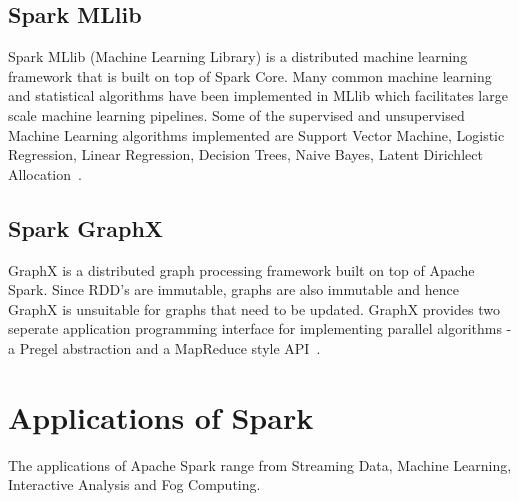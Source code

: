 \subsection{Spark MLlib}
Spark MLlib (Machine Learning Library) is a distributed machine learning 
framework that is built on top of Spark Core. Many common machine learning and 
statistical algorithms have been implemented in MLlib which facilitates large 
scale machine learning pipelines. Some of the supervised and unsupervised 
Machine Learning algorithms implemented are Support Vector Machine, Logistic 
Regression, Linear Regression, Decision Trees, Naive Bayes, Latent Dirichlect 
Allocation~\cite{hid-sp18-408-Spark}.


\subsection{Spark GraphX}
GraphX is a distributed graph processing framework built on top of Apache Spark. 
Since RDD's are immutable, graphs are also immutable and hence GraphX is 
unsuitable for graphs that need to be updated. GraphX provides two seperate 
application programming interface for implementing parallel algorithms - a 
Pregel abstraction and a MapReduce style API~\cite{hid-sp18-408-Spark}.


\section{Applications of Spark}

The applications of Apache Spark range from Streaming Data, Machine Learning, 
Interactive Analysis and Fog Computing.

